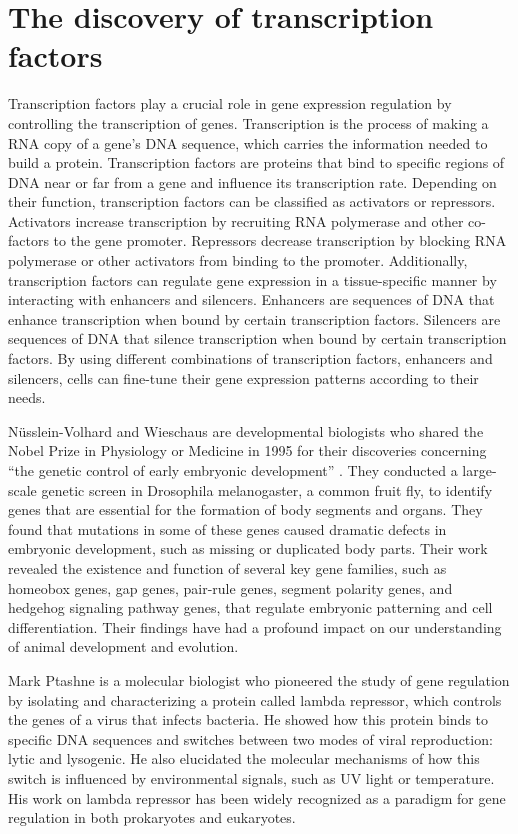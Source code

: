 \documentclass[sn-standardnature]{sn-jnl}%
\theoremstyle{thmstyleone}%
\theoremstyle{thmstyletwo}%
\theoremstyle{thmstylethree}%
\begin{document}
\section*{The discovery of transcription factors}\label{sec3}

Transcription factors play a crucial role in gene expression regulation by controlling the transcription of genes. Transcription is the process of making a RNA copy of a gene's DNA sequence, which carries the information needed to build a protein. Transcription factors are proteins that bind to specific regions of DNA near or far from a gene and influence its transcription rate. Depending on their function, transcription factors can be classified as activators or repressors. Activators increase transcription by recruiting RNA polymerase and other co-factors to the gene promoter. Repressors decrease transcription by blocking RNA polymerase or other activators from binding to the promoter. Additionally, transcription factors can regulate gene expression in a tissue-specific manner by interacting with enhancers and silencers. Enhancers are sequences of DNA that enhance transcription when bound by certain transcription factors. Silencers are sequences of DNA that silence transcription when bound by certain transcription factors. By using different combinations of transcription factors, enhancers and silencers, cells can fine-tune their gene expression patterns according to their needs.

Nüsslein-Volhard and Wieschaus are developmental biologists who shared the Nobel Prize in Physiology or Medicine in 1995 for their discoveries concerning “the genetic control of early embryonic development” \cite{nobel1995press,nusslein2017heidelberg,nusslein1980mutations,nobel1995summary}. They conducted a large-scale genetic screen in Drosophila melanogaster, a common fruit fly, to identify genes that are essential for the formation of body segments and organs. They found that mutations in some of these genes caused dramatic defects in embryonic development, such as missing or duplicated body parts. Their work revealed the existence and function of several key gene families, such as homeobox genes, gap genes, pair-rule genes, segment polarity genes, and hedgehog signaling pathway genes, that regulate embryonic patterning and cell differentiation. Their findings have had a profound impact on our understanding of animal development and evolution.

Mark Ptashne is a molecular biologist who pioneered the study of gene regulation by isolating and characterizing a protein called lambda repressor\cite{ptashne2004genetic,ptashne2007transcriptional,ptashne2015regulation}, which controls the genes of a virus that infects bacteria. He showed how this protein binds to specific DNA sequences and switches between two modes of viral reproduction: lytic and lysogenic. He also elucidated the molecular mechanisms of how this switch is influenced by environmental signals, such as UV light or temperature. His work on lambda repressor has been widely recognized as a paradigm for gene regulation in both prokaryotes and eukaryotes.
\end{document}
